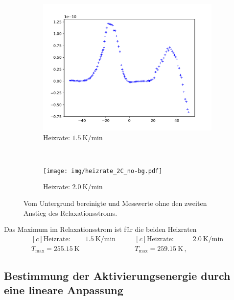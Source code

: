 \begin{figure}[htp]
    \centering
    \begin{subfigure}[t]{0.5\textwidth}
        \centering
        \includegraphics[width=\textwidth]{img/heizrate_15C_no-bg.pdf}
        \caption{Heizrate: $\SI{1.5}{\kelvin\per\minute}$}
    \end{subfigure}%
    ~
    \begin{subfigure}[t]{0.5\textwidth}
        \centering
        \texttt{[image: img/heizrate\_2C\_no-bg.pdf]}
        \caption{Heizrate: $\SI{2.0}{\kelvin\per\minute}$}
    \end{subfigure}
    \caption{Vom Untergrund bereinigte und Messwerte ohne den zweiten Anstieg des Relaxationsstroms.}
    \label{fig:no-bg}
\end{figure}

Das Maximum im Relaxationsstrom ist für die beiden Heizraten
\begin{equation*}
\begin{aligned}[c]
  \text{Heizrate: }& \SI{1.5}{\kelvin\per\minute}\\
  T_\text{max} = \SI{255.15}{\kelvin}
\end{aligned}
\qquad
\begin{aligned}[c]
  \text{Heizrate: }& \SI{2.0}{\kelvin\per\minute}\\
  T_\text{max} = \SI{259.15}{\kelvin}\,,
\end{aligned}
\end{equation*}

\subsection{Bestimmung der Aktivierungsenergie durch eine lineare Anpassung}
\label{sec:lin}

